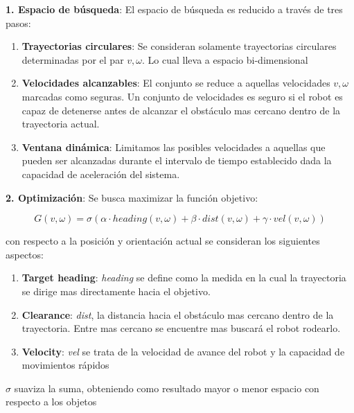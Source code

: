 \documentclass[10pt]{article}
\begin{document}
\begin{mdframed}

	\textbf{1. Espacio de búsqueda}: El espacio de búsqueda es reducido a través de tres pasos:
\begin{enumerate}[label={(\alph*)}]

	\item \textbf{Trayectorias circulares}: Se consideran solamente trayectorias circulares determinadas por el par $v, \omega$. Lo cual lleva a espacio bi-dimensional
	
	\item \textbf{Velocidades alcanzables}: El conjunto se reduce a aquellas velocidades $v, \omega$ marcadas como seguras. Un conjunto de velocidades es seguro si el robot es capaz de detenerse antes de alcanzar el obstáculo mas cercano dentro de la trayectoria actual.
	
	\item \textbf{Ventana dinámica}: Limitamos las posibles velocidades a aquellas que pueden ser alcanzadas durante el intervalo de tiempo  establecido dada la capacidad de aceleración del sistema.
	
\end{enumerate}


\textbf{2. Optimización}: Se busca maximizar la función objetivo:

	\begin{equation}
		G(v, \omega) = 
			\sigma(\alpha \cdot heading(v, \omega) + \beta \cdot dist(v, \omega) + \gamma \cdot vel(v, \omega))
	\end{equation}

con respecto a la posición y orientación actual se consideran los siguientes aspectos:

\begin{enumerate}[label={(\alph*)}]
	\item \textbf{Target heading}: \textit{heading} se define como la medida en la cual la trayectoria se dirige mas directamente hacia el objetivo.
	\item \textbf{Clearance}: \textit{dist}, la distancia hacia el obstáculo mas cercano dentro de la trayectoria. Entre mas cercano se encuentre mas buscará el robot rodearlo.
	\item \textbf{Velocity}: \textit{vel} se trata de la velocidad de avance del robot y la capacidad de movimientos rápidos
\end{enumerate}
$\sigma$ suaviza la suma, obteniendo como resultado mayor o menor espacio con respecto a los objetos

\end{mdframed}
\end{document}
